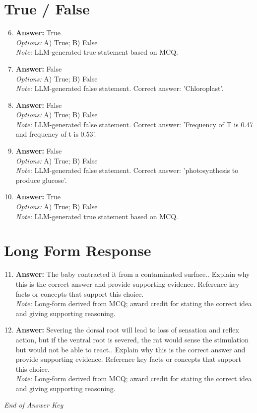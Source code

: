 \documentclass[12pt]{article}
\begin{document}
\section*{True / False}
\begin{enumerate}[label=\arabic*.]
\setcounter{enumi}{5}
\item \textbf{Answer:} True
\\ \textit{Options:} A) True; B) False
\\ \textit{Note:} LLM-generated true statement based on MCQ.
\item \textbf{Answer:} False
\\ \textit{Options:} A) True; B) False
\\ \textit{Note:} LLM-generated false statement. Correct answer: 'Chloroplast'.
\item \textbf{Answer:} False
\\ \textit{Options:} A) True; B) False
\\ \textit{Note:} LLM-generated false statement. Correct answer: 'Frequency of T is 0.47 and frequency of t is 0.53'.
\item \textbf{Answer:} False
\\ \textit{Options:} A) True; B) False
\\ \textit{Note:} LLM-generated false statement. Correct answer: 'photosynthesis to produce glucose'.
\item \textbf{Answer:} True
\\ \textit{Options:} A) True; B) False
\\ \textit{Note:} LLM-generated true statement based on MCQ.
\end{enumerate}

\section*{Long Form Response}
\begin{enumerate}[label=\arabic*.]
\setcounter{enumi}{10}
\item \textbf{Answer:} The baby contracted it from a contaminated surface.. Explain why this is the correct answer and provide supporting evidence. Reference key facts or concepts that support this choice.
\\ \textit{Note:} Long-form derived from MCQ; award credit for stating the correct idea and giving supporting reasoning.
\item \textbf{Answer:} Severing the dorsal root will lead to loss of sensation and reflex action, but if the ventral root is severed, the rat would sense the stimulation but would not be able to react.. Explain why this is the correct answer and provide supporting evidence. Reference key facts or concepts that support this choice.
\\ \textit{Note:} Long-form derived from MCQ; award credit for stating the correct idea and giving supporting reasoning.
\end{enumerate}

\vfill
\noindent\textit{End of Answer Key}
\end{document}
